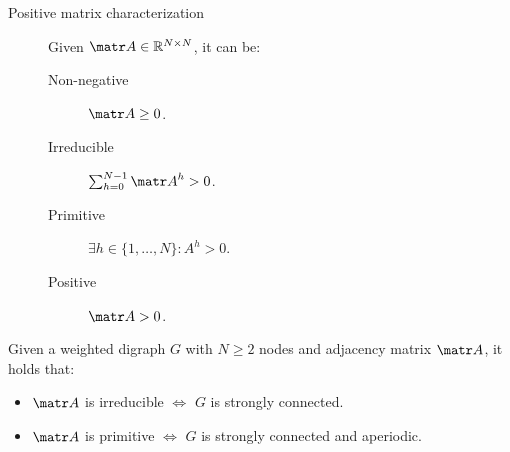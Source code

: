 \begin{description}
    \item[Positive matrix characterization]
        Given $\A \in \mathbb{R}^{N \times N}$, it can be:
        \begin{description}
            \item[Non-negative] 
                $\A \geq 0$.
            \item[Irreducible] 
                $\sum_{h=0}^{N-1} \A^h > 0$.
            \item[Primitive] 
                $\exists h \in \{ 1, \dots, N \}: A^h > 0$.
            \item[Positive] 
                $\A > 0$.
        \end{description}
\end{description}





\begin{theorem} \label{th:positive_matrix_digraph_connected}
    Given a weighted digraph $G$ with $N \geq 2$ nodes and adjacency matrix $\A$, it holds that:
    \begin{itemize}
        \item $\A$ is irreducible $\iff$ $G$ is strongly connected.
        \item $\A$ is primitive $\iff$ $G$ is strongly connected and aperiodic.
    \end{itemize}
\end{theorem}



